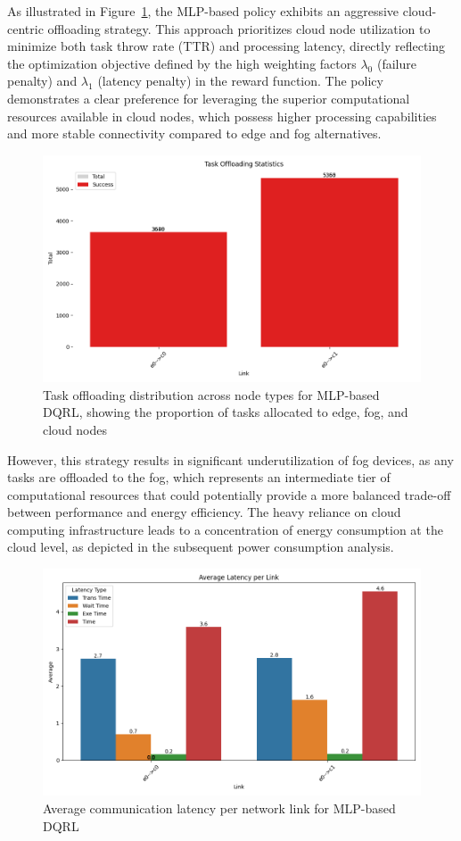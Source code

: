 \documentclass[preprint,12pt]{elsarticle}
\begin{document}
As illustrated in Figure~\ref{fig:mlp-task-offloading-stats}, the MLP-based policy exhibits an aggressive cloud-centric offloading strategy. This approach prioritizes cloud node utilization to minimize both task throw rate (TTR) and processing latency, directly reflecting the optimization objective defined by the high weighting factors $\lambda_0$ (failure penalty) and $\lambda_1$ (latency penalty) in the reward function. The policy demonstrates a clear preference for leveraging the superior computational resources available in cloud nodes, which possess higher processing capabilities and more stable connectivity compared to edge and fog alternatives.

\begin{figure}[H]
    \centering
    \includegraphics[width=0.5\linewidth]{figs/mlp_task_offloading_statistics.png}
    \caption{Task offloading distribution across node types for MLP-based DQRL, showing the proportion of tasks allocated to edge, fog, and cloud nodes}
    \label{fig:mlp-task-offloading-stats}
\end{figure}

However, this strategy results in significant underutilization of fog devices, as any tasks are offloaded to the fog, which represents an intermediate tier of computational resources that could potentially provide a more balanced trade-off between performance and energy efficiency. The heavy reliance on cloud computing infrastructure leads to a concentration of energy consumption at the cloud level, as depicted in the subsequent power consumption analysis.

\begin{figure}[H]
    \centering
    \includegraphics[width=0.5\linewidth]{figs/mlp_avg_latency_per_link.png}
    \caption{Average communication latency per network link for MLP-based DQRL}
    \label{fig:mlp-avg-latency}
\end{figure}
\end{document}
